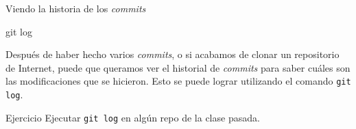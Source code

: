 \begin{frame}[t]{Viendo la historia de los \textit{commits}}
    \begin{comando}
        git log
    \end{comando}

    \pause
    \begin{block}{}
        Después de haber hecho varios \textit{commits}, o si acabamos de clonar un repositorio
        de Internet, puede que queramos ver el historial de \textit{commits} para saber cuáles
        son las modificaciones que se hicieron. Esto se puede lograr utilizando el
        comando \texttt{git log}.
    \end{block}

    \pause
    \begin{ejercicio}{Ejercicio}
        Ejecutar \texttt{git log} en algún repo de la clase pasada.
    \end{ejercicio}
\end{frame}

